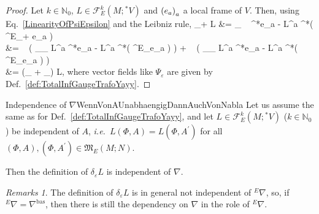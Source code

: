 \documentclass[a4paper,oneside,11pt]{scrartcl} %
\def\bas#1\eas{\begin{align*}#1\end{align*}}
\theoremstyle{plain}
\theoremstyle{remark}
\newtheorem{remark}[theorem]{Remarks}
\theoremstyle{definition}
\begin{document}
\begin{proof}
\leavevmode\newline
Let $k \in \mathbb{N}_0$, $L \in \mathcal{F}^k_E(M; {}^*V)$ and $\mleft( e_a \mright)_a$ a local frame of $V$. Then, using Eq.~\eqref{LinearityOfPsiEpsilon} and the Leibniz rule,
\bas
\delta_{\alpha \varepsilon + \beta \vartheta} L
&=
_{ }
 \otimes ~ {}^*e_a
	- L^a \otimes {}^*\mleft( {}^E\nabla_{\alpha \varepsilon + \beta \vartheta} e_a \mright)
\\
&=
\alpha ~ \mleft(
	_{\Psi_\varepsilon} L^a \otimes {}^*e_a
	- L^a \otimes {}^*\mleft( {}^E\nabla_\varepsilon e_a \mright)
\mright)
	+ \beta ~ \mleft(
	_{\Psi_\vartheta} L^a \otimes {}^*e_a
	- L^a \otimes {}^*\mleft( {}^E\nabla_\vartheta e_a \mright)
\mright)
\\
&=
\mleft(\alpha \delta_\varepsilon
	+ \beta \delta_\vartheta\mright) L,
\eas
where vector fields like $\Psi_\varepsilon$ are given by Def.~\ref{def:TotalInfGaugeTrafoYayy}.
\end{proof}

\begin{corollaries}{Independence of $\nabla$}{WennVonAUnabhaengigDannAuchVonNabla}
Let us assume the same as for Def.~\ref{def:TotalInfGaugeTrafoYayy}, and let $L \in \mathcal{F}^k_E(M; {}^*V)$ ($k \in \mathbb{N}_0$) be independent of $A$, \textit{i.e.}~$L(\Phi,A) = L(\Phi, A^\prime)$ for all $(\Phi,A), (\Phi, A^\prime) \in \mathfrak{M}_E(M; N)$.

Then the definition of $\delta_\varepsilon L$ is independent of $\nabla$.
\end{corollaries}

\begin{remark}
\leavevmode\newline
The definition of $\delta_\varepsilon L$ is in general not independent of ${}^E\nabla$, so, if ${}^E\nabla = \nabla^{\mathrm{bas}}$, then there is still the dependency on $\nabla$ in the role of ${}^E\nabla$.
\end{remark}
\end{document}
